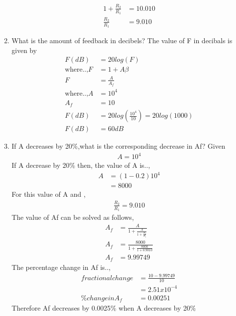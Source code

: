 \begin{enumerate}[label=\thesubsection.\arabic*.,ref=\thesubsection.\theenumi]
\begin{align}
\\
1+\frac{R_2}{R_1} &= 10.010
\\
\frac{R_2}{R_1} &= 9.010
\end{align}
\item What is the amount of feedback in decibels?
\solution The value of F in decibals is given by 
\begin{align}
    F(dB) &= 20log(F)\\
\text{where..,} F &= 1+A\beta \\
F &= \frac{A}{A_f}\\
\text{where..,} A&=10^4 \\ A_f &= 10\\
F(dB) &= 20log(\frac{10^4}{10})=20log(1000)\\
F(dB) &= 60 dB
\end{align}
\item If A decreases by 20\%,what is the corresponding decrease in Af?
\solution Given
\begin{align}
A = 10^4
\end{align}
If A decrease by 20\% then,
the value of A is..,
\begin{align}
    A &= (1-0.2)10^4 \\
      &= 8000
\end{align}
For this value of A and ,
\begin{align}
    \frac{R_2}{R_1} = 9.010
\end{align}
The value of Af can be solved as follows,
\begin{align}
 A_f &= \frac{A}{1+\frac{A}{1+\frac{R_2}{R_1}}}\\
 A_f &= \frac{8000}{1+\frac{8000}{1+0.9010}}\\
 A_f &= 9.99749
\end{align}
The percentage change in Af is..,
\begin{align}
    fractionalchange &= \frac{10-9.99749}{10}\\
      &= 2.51x10^{-4}\\
     \% change in A_f &= 0.00251
\end{align}
Therefore Af decreases by 0.0025\% when A decreases by 20\%
\end{enumerate}
